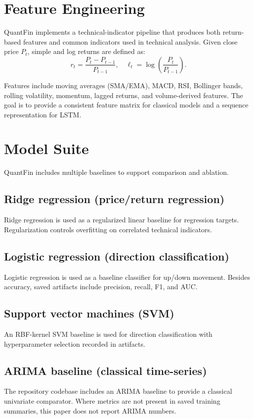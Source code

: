 \documentclass{svproc}
\begin{document}
\section{Feature Engineering}\label{sec:features}
QuantFin implements a technical-indicator pipeline that produces both return-based features and common indicators used in technical analysis. Given close price $P_t$, simple and log returns are defined as:
\begin{equation}
r_t = \frac{P_t - P_{t-1}}{P_{t-1}},\quad \ell_t = \log\left(\frac{P_t}{P_{t-1}}\right).
\end{equation}

Features include moving averages (SMA/EMA), MACD, RSI, Bollinger bands, rolling volatility, momentum, lagged returns, and volume-derived features. The goal is to provide a consistent feature matrix for classical models and a sequence representation for LSTM.

\section{Model Suite}\label{sec:models}
QuantFin includes multiple baselines to support comparison and ablation.

\subsection{Ridge regression (price/return regression)}
Ridge regression is used as a regularized linear baseline for regression targets. Regularization controls overfitting on correlated technical indicators.

\subsection{Logistic regression (direction classification)}
Logistic regression is used as a baseline classifier for up/down movement. Besides accuracy, saved artifacts include precision, recall, F1, and AUC.

\subsection{Support vector machines (SVM)}
An RBF-kernel SVM baseline is used for direction classification with hyperparameter selection recorded in artifacts.

\subsection{ARIMA baseline (classical time-series)}
The repository codebase includes an ARIMA baseline to provide a classical univariate comparator. Where metrics are not present in saved training summaries, this paper does not report ARIMA numbers.
\end{document}
